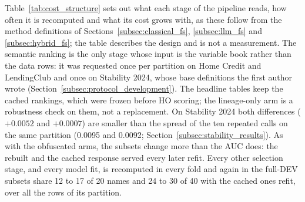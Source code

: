 \documentclass[final,5p,twocolumn]{elsarticle}
\providecommand{\DIFaddtex}[1]{{\protect\color{blue} \sf #1}} %
\providecommand{\DIFdeltex}[1]{{\protect\color{red} \scriptsize #1}} %
\providecommand{\DIFaddbegin}{} %
\providecommand{\DIFaddend}{} %
\providecommand{\DIFdelbegin}{} %
\providecommand{\DIFdelend}{} %
\providecommand{\DIFadd}[1]{\texorpdfstring{\DIFaddtex{#1}}{#1}} %
\providecommand{\DIFdel}[1]{\texorpdfstring{\DIFdeltex{#1}}{}} %
\begin{document}
\DIFadd{Table~\ref{tab:cost_structure} sets out what each stage of the pipeline reads, how often it is recomputed and what its cost grows with, as these follow from the method definitions of Sections~\ref{subsec:classical_fs}, \ref{subsec:llm_fs} and \ref{subsec:hybrid_fs}; the table describes the design and is not a measurement. The semantic ranking is the only stage whose input is the variable book rather than the data rows: it was requested once per partition on Home Credit and LendingClub and once on Stability }\DIFaddend 2024, \DIFdelbegin \DIFdel{whose base definitions the first author wrote (Section~\ref{subsec:protocol_development}). The headline tables keep the cached rankings, which were frozen before HO scoring; the lineage-only arm is a robustness check on them, not a replacement. On Stability 2024 both differences ($+0.0052$ and $+0.0007$) are smaller than the spread of the ten repeated calls on the same partition (0.0095 and 0.0092; Section~\ref{subsec:stability_results}). As with the obfuscated arms, the subsets change more than the AUC does: the rebuilt }\DIFdelend \DIFaddbegin \DIFadd{and the cached response served every later refit. Every other selection stage, and every model fit, is recomputed in every fold and again in the }\DIFaddend full-DEV \DIFdelbegin \DIFdel{subsets share 12 to 17 of 20 names and 24 to 30 of 40 with the cached ones}\DIFdelend \DIFaddbegin \DIFadd{refit, over all the rows of its partition}\DIFaddend .
\end{document}
